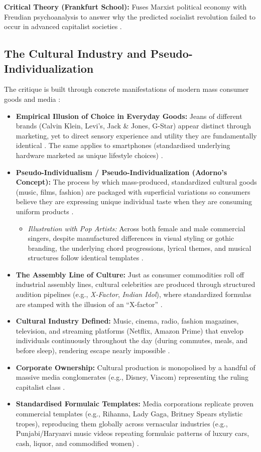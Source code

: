 \begin{KeyConcept}
\textbf{Critical Theory (Frankfurt School):} Fuses Marxist political economy with Freudian psychoanalysis to answer why the predicted socialist revolution failed to occur in advanced capitalist societies .
\end{KeyConcept}

\subsection{The Cultural Industry and Pseudo-Individualization}
The critique is built through concrete manifestations of modern mass consumer goods and media :
\begin{itemize}
    \item \textbf{Empirical Illusion of Choice in Everyday Goods:} Jeans of different brands (Calvin Klein, Levi's, Jack \& Jones, G-Star) appear distinct through marketing, yet to direct sensory experience and utility they are fundamentally identical . The same applies to smartphones (standardised underlying hardware marketed as unique lifestyle choices) .
    \item \textbf{Pseudo-Individualism / Pseudo-Individualization (Adorno's Concept):} The process by which mass-produced, standardized cultural goods (music, films, fashion) are packaged with superficial variations so consumers believe they are expressing unique individual taste when they are consuming uniform products .
    \begin{itemize}
        \item \textit{Illustration with Pop Artists:} Across both female and male commercial singers, despite manufactured differences in visual styling or gothic branding, the underlying chord progressions, lyrical themes, and musical structures follow identical templates .
    \end{itemize}
    \item \textbf{The Assembly Line of Culture:} Just as consumer commodities roll off industrial assembly lines, cultural celebrities are produced through structured audition pipelines (e.g., \textit{X-Factor}, \textit{Indian Idol}), where standardized formulas are stamped with the illusion of an ``X-factor'' .
    \item \textbf{Cultural Industry Defined:} Music, cinema, radio, fashion magazines, television, and streaming platforms (Netflix, Amazon Prime) that envelop individuals continuously throughout the day (during commutes, meals, and before sleep), rendering escape nearly impossible .
    \item \textbf{Corporate Ownership:} Cultural production is monopolised by a handful of massive media conglomerates (e.g., Disney, Viacom) representing the ruling capitalist class .
    \item \textbf{Standardised Formulaic Templates:} Media corporations replicate proven commercial templates (e.g., Rihanna, Lady Gaga, Britney Spears stylistic tropes), reproducing them globally across vernacular industries (e.g., Punjabi/Haryanvi music videos repeating formulaic patterns of luxury cars, cash, liquor, and commodified women) .
\end{itemize}

